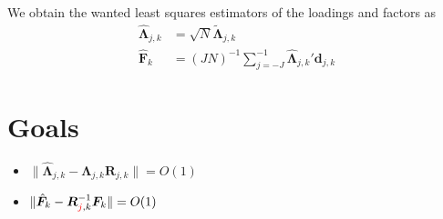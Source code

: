 \documentclass{article}
\numberwithin{equation}{section}
\let \oldsum \sum
\renewcommand{\sum}{\displaystyle \oldsum}
\newcommand{\scalesum}{\sum_{j=-J}^{-1}}
\newcommand{\coeffs}[2]{\bm{d}_{#1,#2}}
\newcommand{\estimLoadings}[2]{\widehat{\bm{\Lambda}}_{#1,#2}}
\newcommand{\estimFactors}[1]{\widehat{\bm{F}}_{#1}}
\begin{document}
We obtain the wanted least squares estimators of the loadings and factors as 
\begin{align}
	\estimLoadings{j}{k} &= \sqrt{N}\bm{\tilde{\Lambda}}_{j,k} \label{eq:estimatorLoadings}\\
	\estimFactors{k} &= (JN)^{-1} \scalesum \estimLoadings{j}{k}' \coeffs{j}{k} \label{eq:estimatorFactors}
\end{align}




\section{Goals}
\begin{itemize}
	\item $\lVert \hat{\bm{\Lambda}}_{j,k} - \bm{\Lambda}_{j,k}\bm{R}_{j,k} \rVert = O(1)$
	\item $\lVert \hat{\bm{F}}_{k} - \bm{R}^{-1}_{\textcolor{red}{j},k}\bm{F}_{k} \rVert = O(1)$
\end{itemize}

































	
\end{document}
